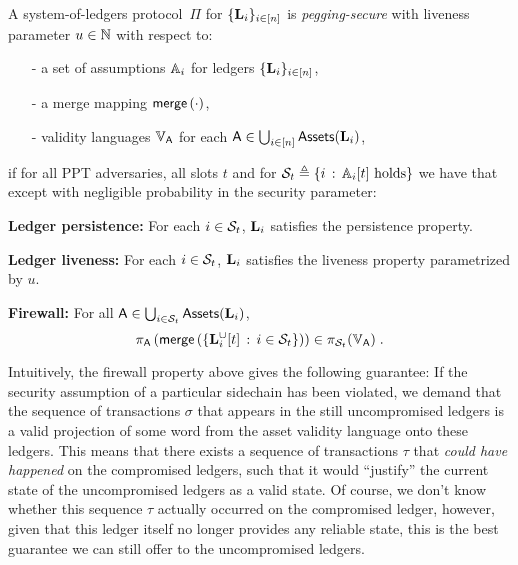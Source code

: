 \begin{definition}
  \label{def:security}
  A system-of-ledgers protocol~$\Pi$ for $\{\Ledger_i\}_{i\in[n]}$ is
  \emph{pegging-secure} with liveness parameter $u\in\N$
  with respect to:
  \begin{itemize}
    \item[-]
      a set of assumptions $\Assum_i$ for ledgers $\{\Ledger_i\}_{i\in[n]}$,
    \item[-]
      a merge mapping $\merge\left(\cdot\right)$,
    \item[-]
      validity languages $\ValLang_\Asset$ for each %
      $\Asset\in\bigcup_{i\in[n]}\Assets(\Ledger_i)$,
  \end{itemize}
  if for all PPT adversaries, all slots $t$
  and for
  $
  \Secure_t\defeq\setd{i}{\Assum_i[t] \text{ holds}}
  $
  we have that except with negligible probability in the security parameter:
  \begin{description}
    \item \textbf{Ledger persistence:}
      For each $i\in\Secure_t$, $\Ledger_i$ satisfies the persistence property. %
    \item \textbf{Ledger liveness:}
      For each $i\in\Secure_t$, $\Ledger_i$ satisfies the liveness property para\-metrized by $u$.
    \item \textbf{Firewall:}
      For all $\Asset\in\bigcup_{i\in\Secure_t}\Assets(\Ledger_i)$,
      $$
      \proj_{\Asset}\left(
        \merge\left(
          \setd
            {\Ledger_i^{\cup}[t]}
            {i\in\Secure_t}
        \right)
      \right)
      \in
      \proj_{\Secure_t}(\ValLang_{\Asset})
      \; .
      $$
  \end{description}
\end{definition}

Intuitively, the firewall property above gives the following guarantee:
If the security
assumption of a particular sidechain has been violated, we demand that the
sequence of transactions $\sigma$ that appears in the still uncompromised
ledgers is a valid projection of some word from the asset validity language onto
these ledgers. This means that there exists a sequence of transactions $\tau$
that \emph{could have happened} on the compromised ledgers, such that it would
``justify'' the current state of the uncompromised ledgers as a valid state.  Of
course, we don't know whether this sequence $\tau$ actually occurred on the
compromised ledger, however, given that this ledger itself no longer provides
any reliable state, this is the best guarantee we can still offer to the
uncompromised ledgers.

